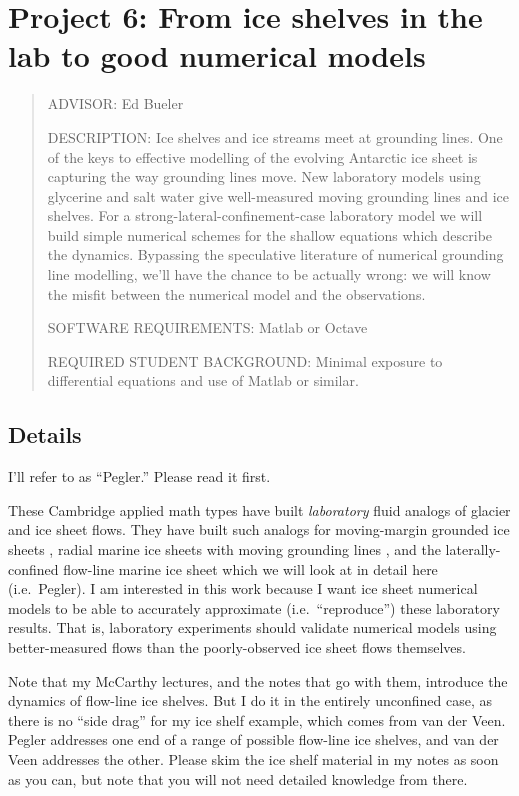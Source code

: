 \documentclass[11pt,final]{amsart}%
\begin{document}
\newpage
\section*{Project 6: From ice shelves in the lab to good numerical models}

\begin{quote}
\noindent ADVISOR: Ed Bueler

\medskip
\noindent DESCRIPTION:  Ice shelves and ice streams meet at grounding lines.  One of the keys to effective modelling of the evolving Antarctic ice sheet is capturing the way grounding lines move.  New laboratory models using glycerine and salt water give well-measured moving grounding lines and ice shelves.  For a strong-lateral-confinement-case laboratory model \citep{Pegleretal2013} we will build simple numerical schemes for the shallow equations which describe the dynamics.  Bypassing the speculative literature of numerical grounding line modelling, we'll have the chance to be actually wrong: we will know the misfit between the numerical model and the observations.

\medskip
\noindent SOFTWARE REQUIREMENTS: Matlab or Octave

\medskip
\noindent REQUIRED STUDENT BACKGROUND: Minimal exposure to differential equations and use of Matlab or similar.
\end{quote}

\subsection*{Details}  I'll refer to  \cite{Pegleretal2013} as ``Pegler.''  Please read it first.

These Cambridge applied math types have built \emph{laboratory} fluid analogs of glacier and ice sheet flows.  They have built such analogs for moving-margin grounded ice sheets \citep{SayagWorster2013}, radial marine ice sheets with moving grounding lines \citep{PeglerWorster2012,SayagPeglerWorster2012}, and the laterally-confined flow-line marine ice sheet which we will look at in detail here (i.e.~Pegler).  I am interested in this work because I want ice sheet numerical models to be able to accurately approximate (i.e.~``reproduce'') these laboratory results.  That is, laboratory experiments should validate numerical models using better-measured flows than the poorly-observed ice sheet flows themselves.

Note that my McCarthy lectures, and the notes that go with them, introduce the dynamics of flow-line ice shelves.  But I do it in the entirely unconfined case, as there is no ``side drag'' for my ice shelf example, which comes from van der Veen.  Pegler addresses one end of a range of possible flow-line ice shelves, and van der Veen addresses the other.  Please skim the ice shelf material in my notes as soon as you can, but note that you will not need detailed knowledge from there.
\end{document}
